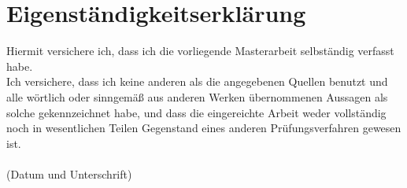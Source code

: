 \chapter*{Eigenständigkeitserklärung}
  Hiermit versichere ich, dass ich die vorliegende Masterarbeit selbständig verfasst habe. \\
  Ich versichere, dass ich keine anderen als die angegebenen Quellen benutzt und alle wörtlich oder 
    sinngemäß aus anderen Werken übernommenen Aussagen als solche gekennzeichnet habe, und dass die 
    eingereichte Arbeit weder vollständig noch in wesentlichen Teilen Gegenstand eines anderen 
    Prüfungsverfahren gewesen ist. \\
  \vspace{2 cm} \\
  (Datum und Unterschrift)

